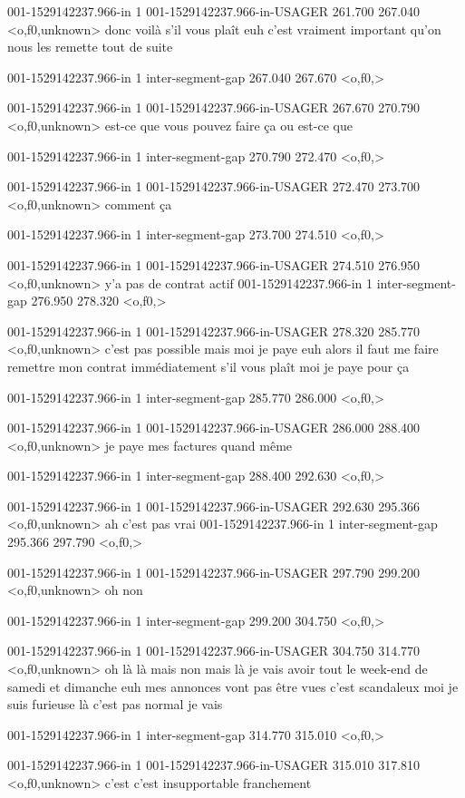 001-1529142237.966-in 1 001-1529142237.966-in-USAGER 261.700 267.040 <o,f0,unknown> donc voilà s'il vous plaît euh c'est vraiment important qu'on nous les remette tout de suite

001-1529142237.966-in 1 inter-segment-gap 267.040 267.670 <o,f0,>

001-1529142237.966-in 1 001-1529142237.966-in-USAGER 267.670 270.790 <o,f0,unknown> est-ce que vous pouvez faire ça ou est-ce que

001-1529142237.966-in 1 inter-segment-gap 270.790 272.470 <o,f0,>

001-1529142237.966-in 1 001-1529142237.966-in-USAGER 272.470 273.700 <o,f0,unknown> comment ça

001-1529142237.966-in 1 inter-segment-gap 273.700 274.510 <o,f0,>

001-1529142237.966-in 1 001-1529142237.966-in-USAGER 274.510 276.950 <o,f0,unknown> y'a pas de contrat actif
001-1529142237.966-in 1 inter-segment-gap 276.950 278.320 <o,f0,>

001-1529142237.966-in 1 001-1529142237.966-in-USAGER 278.320 285.770 <o,f0,unknown> c'est pas possible mais moi je paye euh alors il faut me faire remettre mon contrat immédiatement s'il vous plaît moi je paye pour ça

001-1529142237.966-in 1 inter-segment-gap 285.770 286.000 <o,f0,>

001-1529142237.966-in 1 001-1529142237.966-in-USAGER 286.000 288.400 <o,f0,unknown> je paye mes factures quand même

001-1529142237.966-in 1 inter-segment-gap 288.400 292.630 <o,f0,>

001-1529142237.966-in 1 001-1529142237.966-in-USAGER 292.630 295.366 <o,f0,unknown> ah c'est pas vrai
001-1529142237.966-in 1 inter-segment-gap 295.366 297.790 <o,f0,>

001-1529142237.966-in 1 001-1529142237.966-in-USAGER 297.790 299.200 <o,f0,unknown> oh non

001-1529142237.966-in 1 inter-segment-gap 299.200 304.750 <o,f0,>

001-1529142237.966-in 1 001-1529142237.966-in-USAGER 304.750 314.770 <o,f0,unknown> oh là là mais non mais là je vais avoir tout le week-end de samedi et dimanche euh mes annonces vont pas être vues c'est scandaleux moi je suis furieuse là c'est pas normal je vais

001-1529142237.966-in 1 inter-segment-gap 314.770 315.010 <o,f0,>

001-1529142237.966-in 1 001-1529142237.966-in-USAGER 315.010 317.810 <o,f0,unknown> c'est c'est insupportable franchement

